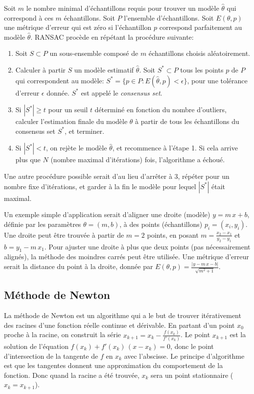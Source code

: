 \documentclass[a4paper,10pt]{scrreprt}
\begin{document}
Soit $m$ le nombre minimal d'échantillons requis pour trouver un modèle $\hat{\theta}$ qui correspond à ces $m$ échantillons. Soit $P$ l'ensemble d'échantillons. Soit $E(\theta, p)$ une métrique d'erreur qui est zéro si l'échantillon $p$ correspond parfaitement au modèle $\hat{\theta}$. RANSAC procède en répétant la procédure suivante:
\begin{enumerate}
	\item Soit $S \subset P$ un sous-ensemble composé de $m$ échantillons choisis aléatoirement.
	\item Calculer à partir $S$ un modèle estimatif $\hat{\theta}$. Soit $S^* \subset P$ tous les points $p$ de $P$ qui correspondent au modèle: $S^* = \{ p \in P : E(\hat{\theta}, p) < \epsilon \}$, pour une tolérance d'erreur $\epsilon$ donnée. $S^*$ est appelé le \emph{consensus set}.
	\item Si $|S^*| \geq t$ pour un seuil $t$ déterminé en fonction du nombre d'outliers, calculer l'estimation finale du modèle $\theta$ à partir de tous les échantillons du consensus set $S^*$, et terminer.
	\item Si $|S^*| < t$, on rejète le modèle $\hat{\theta}$, et recommence à l'étape 1. Si cela arrive plus que $N$ (nombre maximal d'itérations) fois, l'algorithme a échoué.
\end{enumerate}
Une autre procédure possible serait d'au lieu d'arrêter à 3, répéter pour un nombre fixe d'itérations, et garder à la fin le modèle pour lequel $|S^*|$ était maximal. 

Un exemple simple d'application serait d'aligner une droite (modèle) $y = m \, x + b$, définie par les paramètres $\theta = (m,b)$, à des points (échantillons) $p_i = (x_i,y_i)$. Une droite peut être trouvée à partir de $m = 2$ points, en posant $m = \frac{x_2 - x_1}{y_2 - y_1}$ et $b = y_1 - m \, x_1$. Pour ajuster une droite à plus que deux points (pas nécessairement alignés), la méthode des moindres carrés peut être utilisée. Une métrique d'erreur serait la distance du point à la droite, donnée par $E(\theta, p) = \frac{|y - m\,x - b|}{\sqrt{m^2 + 1}}$.


\subsection{Méthode de Newton} \label{sec:newton}
La méthode de Newton est un algorithme qui a le but de trouver itérativement des racines d'une fonction réelle continue et dérivable. En partant d'un point $x_0$ proche à la racine, on construit la série $x_{k+1} = x_{k} - \frac{f(x_k)}{f'(x_k)}$. Le point $x_{k+1}$ est la solution de l'équation $f(x_k) + f'(x_k) \, (x - x_k) = 0$, donc le point d'intersection de la tangente de $f$ en $x_k$ avec l'abscisse. Le principe d'algorithme est que les tangentes donnent une approximation du comportement de la fonction. Donc quand la racine a été trouvée, $x_k$ sera un point stationnaire ($x_k = x_{k+1}$).
\end{document}
